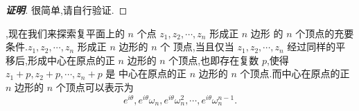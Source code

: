 \documentclass[twoside,11pt]{article}
\newtheorem{lemma}{定理}
\begin{document}
\begin{proof}[\textbf{证明}]
很简单,请自行验证.
\end{proof}
\iffalse
\begin{lemma}
设 $z_1,z_2,z_3,z_4,z_5$ 为复平面上的五个点 $Z_1,Z_2,Z_3,Z_4,Z_5$ 所
  代表的复数,且 $Z_1,Z_2,Z_3,Z_4,Z_5$ 不共线时,则按照逆时针方向放置.则
  这五个点形成以 $p$ 为中心的正五边形的五个顶点,当且仅当
  \begin{equation}
    \label{eq:12.08}
    \begin{cases}
      z_1+z_2+z_3+z_4+z_5=5p,\\
z_1+\omega_5z_2+\omega_5^2z_3+\omega_5^3z_4+\omega_5^4z_5=0,\\
z_1+\omega_5^2z_2+\omega_5^4z_3+\omega_5^6z_4+\omega_5^8z_5=0,\\

    \end{cases}
  \end{equation}
其中 $\omega_5=e^{\frac{2\pi i}{5}}$ 是5次单位根.
\end{lemma}\fi

,现在我们来探索复平面上的 $n$ 个点 $z_1,z_2,\cdots,z_n$ 形成正 $n$ 边形
的 $n$ 个顶点的充要条件.$z_1,z_2,\cdots,z_n$ 形成正 $n$ 边形的 $n$ 个
顶点,当且仅当 $z_1,z_2,\cdots,z_n$ 经过同样的平移后,形成中心在原点的正 $n$
边形的 $n$ 个顶点,也即存在复数 $p$,使得 $z_1+p,z_2+p,\cdots,z_n+p$ 是
中心在原点的正 $n$ 边形的 $n$ 个顶点.而中心在原点的正 $n$ 边形的 $n$
个顶点可以表示为
$$
e^{i\theta},e^{i\theta}\omega_n,e^{i\theta}\omega_n^2,\cdots,e^{i\theta}\omega_n^{n-1}.
$$\fi

\end{document}
